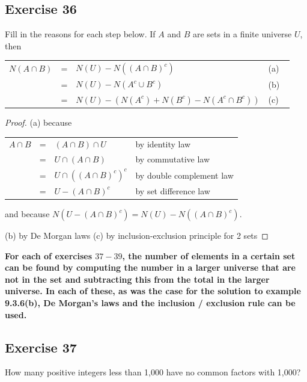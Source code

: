 \documentclass[14pt]{extarticle}
\newcommand{\fbl}{\underline{\hspace{1cm}}\,\,}
\newcommand{\cy}{\color{cyan}}
\begin{document}
\subsection{Exercise 36}
Fill in the reasons for each step below. If $A$ and $B$ are sets in a finite universe $U$, then
\begin{center}
\begin{tabular}{rcll}
\(N(A \cap B)\) & = & \(N(U) - N((A \cap B)^c)\) & {\cy (a) \fbl} \\
& = & \(N(U) - N(A^c \cup B^c)\) & {\cy (b) \fbl} \\
& = & \(N(U) - (N(A^c) + N(B^c) - N(A^c \cap B^c))\) & {\cy (c) \fbl}
\end{tabular}
\end{center}
\begin{proof}
(a) because 
\begin{center}
\begin{tabular}{rcll}
\(A \cap B\) & = & \((A \cap B) \cap U\) & {\cy by identity law} \\
& = & \(U \cap (A \cap B)\) & {\cy by commutative law} \\
& = & \(U \cap ((A \cap B)^c)^c\) & {\cy by double complement law} \\
& = & \(U - (A \cap B)^c\) & {\cy by set difference law} \\
\end{tabular}
\end{center}
and because \(N(U - (A \cap B)^c) = N(U) - N((A \cap B)^c)\).

(b) by De Morgan laws (c) by inclusion-exclusion principle for 2 sets
\end{proof}

{\bf \cy For each of exercises $37-39$, the number of elements in a certain set can be found by computing the 
number in a larger universe that are not in the set and subtracting this from the total in the larger universe. In 
each of these, as was the case for the solution to example 9.3.6(b), De Morgan’s laws and the inclusion / exclusion 
rule can be used.}

\subsection{Exercise 37}
How many positive integers less than 1,000 have no common factors with 1,000?
\end{document}
